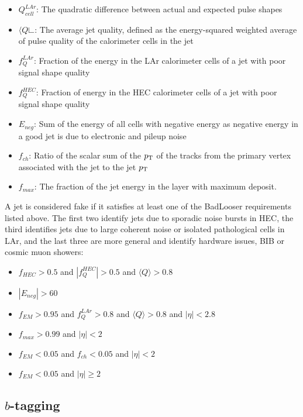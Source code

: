 \begin{itemize}
	\item $Q^{LAr}_{cell}$: The quadratic difference between actual and expected pulse shapes
	\item $\langle Q \rightangle$: The average jet quality, defined as the energy-squared weighted average of pulse quality of the calorimeter cells in the jet
	\item $f_{Q}^{LAr}$: Fraction of the energy in the LAr calorimeter cells of a jet with poor signal shape quality
	\item $f_{Q}^{HEC}$: Fraction of energy in the HEC calorimeter cells of a jet with poor signal shape quality
	\item $E_{neg}$: Sum of the energy of all cells with negative energy as negative energy in a good jet is due to electronic and pileup noise
	\item $f_{ch}$: Ratio of the scalar sum of the $p_{\mathrm{T}}$ of the tracks from the primary vertex associated with the jet to the jet $p_{\mathrm{T}}$
	\item $f_{max}$: The fraction of the jet energy in the layer with maximum deposit.
\end{itemize}

A jet is considered fake if it satisfies at least one of the BadLooser requirements listed above.  The first two identify jets due to sporadic noise bursts in HEC, the third identifies jets due to large coherent noise or isolated pathological cells in LAr, and the last three are more general and identify hardware issues, BIB or cosmic muon showers:

\begin{itemize}
	\item $f_{HEC}>0.5$ and $|f_{Q}^{HEC}|>0.5$ and $\langle Q \rangle > 0.8$ 
	\item $|E_{neg}|>60$ 
	\item $f_{EM}>0.95$ and $f_{Q}^{LAr}>0.8$ and $\langle Q \rangle > 0.8$ and $|\eta|<2.8$
	\item $f_{max}>0.99$ and $|\eta|<2$  
	\item $f_{EM}<0.05$ and $f_{ch}<0.05$ and $|\eta|<2$
	\item $f_{EM}<0.05$ and $|\eta|\geq2$
\end{itemize}


\subsection{$b$-tagging}

